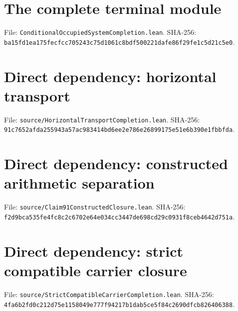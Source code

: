 \documentclass[11pt]{article}
\newcommand{\code}[1]{\nolinkurl{#1}}
\begin{document}
\clearpage
\section{The complete terminal module}
\label{source:ConditionalOccupiedSystemCompletion}
File: \code{ConditionalOccupiedSystemCompletion.lean}. SHA-256: \code{ba15fd1ea175fecfcc705243c75d1061c8bdf500221dafe86f29fe1c5d21c5e0}.

\clearpage
\section{Direct dependency: horizontal transport}
\label{source:HorizontalTransportCompletion}
File: \code{source/HorizontalTransportCompletion.lean}. SHA-256: \code{91c7652afda255943a57ac983414bd6ee2e786e26899175e51e6b390e1fbbfda}.

\clearpage
\section{Direct dependency: constructed arithmetic separation}
\label{source:Claim91ConstructedClosure}
File: \code{source/Claim91ConstructedClosure.lean}. SHA-256: \code{f2d9bca535fe4fc8c2c6702e64e034cc3447de698cd29c0931f8ceb4642d751a}.

\clearpage
\section{Direct dependency: strict compatible carrier closure}
\label{source:StrictCompatibleCarrierCompletion}
File: \code{source/StrictCompatibleCarrierCompletion.lean}. SHA-256: \code{4fa6b2fd0c212d75e1158049e777f94217b1dab5ce5f84c2690dfcb826406388}.
\end{document}
